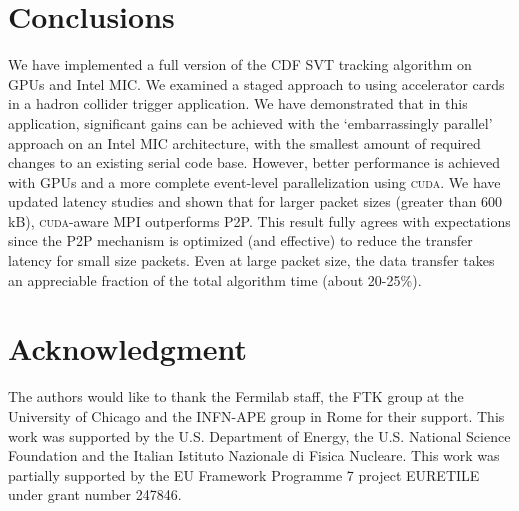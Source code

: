 \documentclass[journal]{IEEEtran}
\begin{document}
\section{Conclusions}
We have implemented a full version of the CDF SVT tracking algorithm
on GPUs and Intel MIC. We examined a staged approach to using
accelerator cards in a hadron collider trigger application. We have
demonstrated that in this application, significant gains can be
achieved with the `embarrassingly parallel' approach on an Intel MIC
architecture, with the smallest amount of required changes to an
existing serial code base. However, better performance is achieved
with GPUs and a more complete event-level parallelization using
\textsc{cuda}.  We have updated latency studies and shown that for larger packet sizes 
(greater than 600 kB), \textsc{cuda}-aware MPI outperforms P2P. This result fully agrees with expectations 
since the P2P mechanism is optimized (and effective) to reduce the transfer latency for 
small size packets.
Even at large packet
size, the data transfer takes an appreciable fraction of the total
algorithm time (about 20-25\%).

%

\section*{Acknowledgment}
The authors would like to thank the Fermilab staff,  the FTK group at the 
University of Chicago and the INFN-APE group in Rome for their support. This work was supported by the
U.S. Department of Energy, the U.S. National Science Foundation and the Italian
Istituto Nazionale di Fisica Nucleare. This work was partially supported by the 
EU Framework Programme 7 project EURETILE under grant number 247846. 




\end{document}
